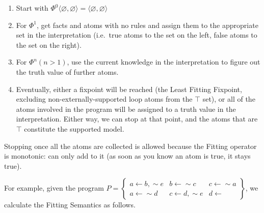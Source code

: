 \documentclass[9pt,a4paper,landscape]{article}
\begin{document}
{\begin{enumerate}[noitemsep]
	\item Start with $\Phi^0 \langle \varnothing, \varnothing \rangle = \langle \varnothing, \varnothing \rangle$
	\item For $\Phi^1$, get facts and atoms with no rules and assign them to the appropriate set in the interpretation (i.e.\ true atoms to the set on the left, false atoms to the set on the right).
	\item For  $\Phi^n (n>1)$, use the current knowledge in the interpretation to figure out the truth value of further atoms.
	\item Eventually, either a fixpoint will be reached (the Least Fitting Fixpoint, excluding non-externally-supported loop atoms from the $\top$ set), or all of the atoms involved in the program will be assigned to a truth value in the interpretation. Either way, we can stop at that point, and the atoms that are $\top$ constitute the supported model.
\end{enumerate}

Stopping once all the atoms are collected is allowed because the Fitting operator is monotonic: can only add to it (as soon as you know an atom is true, it stays true).

For example, given the program $P = \left\{\begin{array}{lll}
a \leftarrow b, {\sim} e & b \leftarrow {\sim} c & c \leftarrow {\sim} a \\
a \leftarrow {\sim} d & c \leftarrow d, {\sim} e & d \leftarrow
\end{array}\right\}$, we calculate the Fitting Semantics as follows.

}
\end{document}
